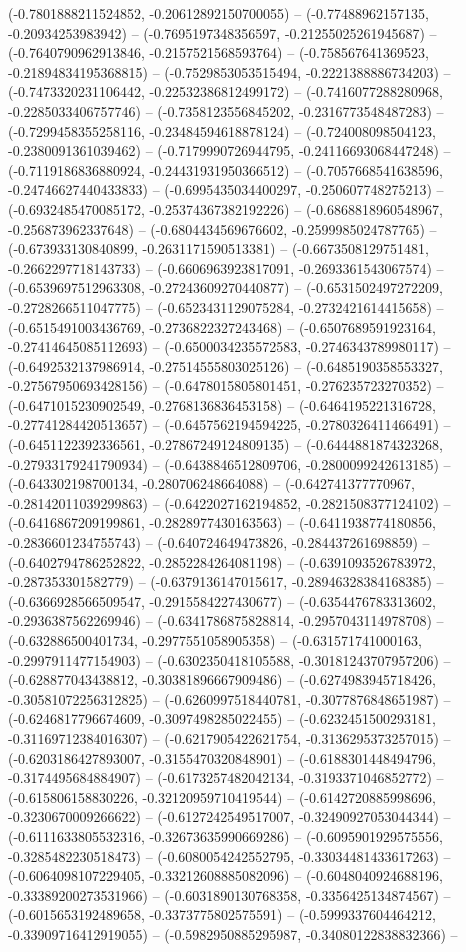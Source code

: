 (-0.7801888211524852, -0.20612892150700055) -- (-0.77488962157135, -0.20934253983942) -- (-0.7695197348356597, -0.21255025261945687) -- (-0.7640790962913846, -0.2157521568593764) -- (-0.758567641369523, -0.21894834195368815) -- (-0.7529853053515494, -0.2221388886734203) -- (-0.7473320231106442, -0.22532386812499172) -- (-0.7416077288280968, -0.2285033406757746) -- (-0.7358123556845202, -0.2316773548487283) -- (-0.7299458355258116, -0.23484594618878124) -- (-0.724008098504123, -0.2380091361039462) -- (-0.7179990726944795, -0.24116693068447248) -- (-0.7119186836880924, -0.24431931950366512) -- (-0.7057668541638596, -0.24746627440433833) -- (-0.6995435034400297, -0.250607748275213) -- (-0.6932485470085172, -0.25374367382192226) -- (-0.6868818960548967, -0.256873962337648) -- (-0.6804434569676602, -0.2599985024787765) -- (-0.673933130840899, -0.2631171590513381) -- (-0.6673508129751481, -0.2662297718143733) -- (-0.6606963923817091, -0.2693361543067574) -- (-0.6539697512963308, -0.27243609270440877) -- (-0.6531502497272209, -0.2728266511047775) -- (-0.6523431129075284, -0.2732421614415658) -- (-0.6515491003436769, -0.2736822327243468) -- (-0.6507689591923164, -0.27414645085112693) -- (-0.6500034235572583, -0.2746343789980117) -- (-0.6492532137986914, -0.27514555803025126) -- (-0.6485190358553327, -0.27567950693428156) -- (-0.6478015805801451, -0.276235723270352) -- (-0.6471015230902549, -0.2768136836453158) -- (-0.6464195221316728, -0.27741284420513657) -- (-0.6457562194594225, -0.2780326411466491) -- (-0.6451122392336561, -0.27867249124809135) -- (-0.6444881874323268, -0.27933179241790934) -- (-0.6438846512809706, -0.2800099242613185) -- (-0.643302198700134, -0.280706248664088) -- (-0.642741377770967, -0.28142011039299863) -- (-0.6422027162194852, -0.2821508377124102) -- (-0.6416867209199861, -0.2828977430163563) -- (-0.6411938774180856, -0.2836601234755743) -- (-0.640724649473826, -0.284437261698859) -- (-0.6402794786252822, -0.2852284264081198) -- (-0.6391093526783972, -0.287353301582779) -- (-0.6379136147015617, -0.28946328384168385) -- (-0.6366928566509547, -0.2915584227430677) -- (-0.6354476783313602, -0.2936387562269946) -- (-0.6341786875828814, -0.2957043114978708) -- (-0.632886500401734, -0.2977551058905358) -- (-0.631571741000163, -0.2997911477154903) -- (-0.6302350418105588, -0.30181243707957206) -- (-0.628877043438812, -0.30381896667909486) -- (-0.6274983945718426, -0.30581072256312825) -- (-0.6260997518440781, -0.3077876848651987) -- (-0.6246817796674609, -0.3097498285022455) -- (-0.6232451500293181, -0.31169712384016307) -- (-0.6217905422621754, -0.3136295373257015) -- (-0.6203186427893007, -0.3155470320848901) -- (-0.6188301448494796, -0.3174495684884907) -- (-0.6173257482042134, -0.3193371046852772) -- (-0.615806158830226, -0.32120959710419544) -- (-0.6142720885998696, -0.3230670009266622) -- (-0.6127242549517007, -0.32490927053044344) -- (-0.6111633805532316, -0.32673635990669286) -- (-0.6095901929575556, -0.3285482230518473) -- (-0.6080054242552795, -0.33034481433617263) -- (-0.6064098107229405, -0.33212608885082096) -- (-0.6048040924688196, -0.33389200273531966) -- (-0.6031890130768358, -0.3356425134874567) -- (-0.6015653192489658, -0.3373775802575591) -- (-0.5999337604464212, -0.33909716412919055) -- (-0.5982950885295987, -0.34080122838832366) -- 
